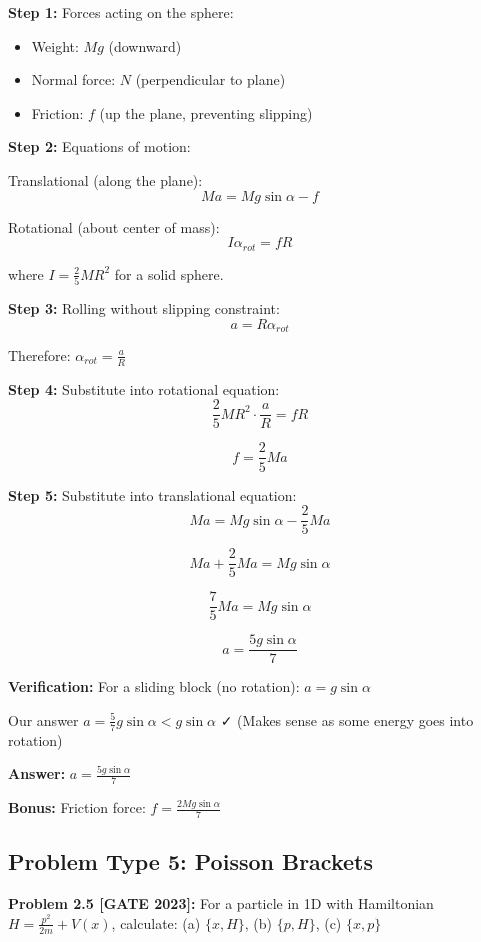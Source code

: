 \documentclass[12pt,a4paper]{article}
\begin{document}
\begin{solution}
\textbf{Step 1:} Forces acting on the sphere:
\begin{itemize}
    \item Weight: $Mg$ (downward)
    \item Normal force: $N$ (perpendicular to plane)
    \item Friction: $f$ (up the plane, preventing slipping)
\end{itemize}

\textbf{Step 2:} Equations of motion:

Translational (along the plane):
$$Ma = Mg\sin\alpha - f$$

Rotational (about center of mass):
$$I\alpha_{rot} = fR$$

where $I = \frac{2}{5}MR^2$ for a solid sphere.

\textbf{Step 3:} Rolling without slipping constraint:
$$a = R\alpha_{rot}$$

Therefore: $\alpha_{rot} = \frac{a}{R}$

\textbf{Step 4:} Substitute into rotational equation:
$$\frac{2}{5}MR^2 \cdot \frac{a}{R} = fR$$

$$f = \frac{2}{5}Ma$$

\textbf{Step 5:} Substitute into translational equation:
$$Ma = Mg\sin\alpha - \frac{2}{5}Ma$$

$$Ma + \frac{2}{5}Ma = Mg\sin\alpha$$

$$\frac{7}{5}Ma = Mg\sin\alpha$$

$$a = \frac{5g\sin\alpha}{7}$$

\textbf{Verification:} For a sliding block (no rotation): $a = g\sin\alpha$

Our answer $a = \frac{5}{7}g\sin\alpha < g\sin\alpha$ ✓ (Makes sense as some energy goes into rotation)

\textbf{Answer:} $a = \frac{5g\sin\alpha}{7}$

\textbf{Bonus:} Friction force: $f = \frac{2Mg\sin\alpha}{7}$
\end{solution}

\subsection{Problem Type 5: Poisson Brackets}

\textbf{Problem 2.5 [GATE 2023]:} For a particle in 1D with Hamiltonian $H = \frac{p^2}{2m} + V(x)$, calculate:
(a) $\{x, H\}$, (b) $\{p, H\}$, (c) $\{x, p\}$
\end{document}
